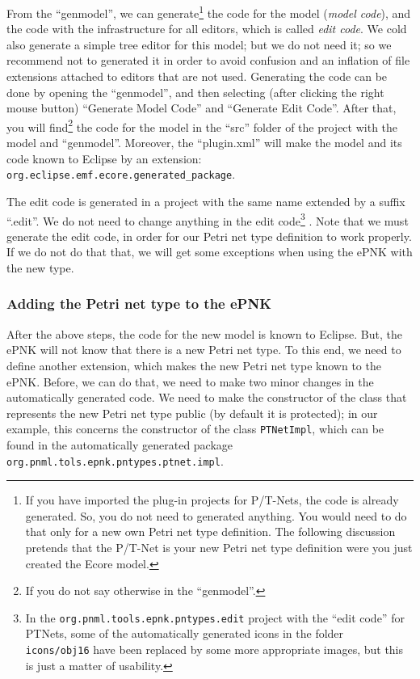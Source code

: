 From the ``genmodel'', we can generate\footnote
  {If you have imported the plug-in projects for P/T-Nets, the code is
   already generated. So, you do not need to generated anything. You would
   need to do that only for a new own Petri net type definition. The following
   discussion pretends that the P/T-Net is your new Petri net type definition
   were you just created the Ecore model.}
the code for the model (\emph{model code}),%
and the code with the infrastructure for all editors, which is called \emph{edit
code}. We cold also generate a simple tree editor for this model; but we do
not need it; so we recommend not to generated it in order to avoid confusion
and an inflation of file extensions attached to editors that are not used.
Generating the code can be done by opening
the ``genmodel'', and then selecting (after clicking the right mouse button)
``Generate Model Code'' and ``Generate Edit Code''. After that, you will find\footnote
  {If you do not say otherwise in the ``genmodel''.}
the code for the model in the ``src'' folder of the project with the model
and ``genmodel''. Moreover, the ``plugin.xml'' will make the model and
its code known to Eclipse by an extension: 
\verb$org.eclipse.emf.ecore.generated_package$.

The edit code is generated in a project with the same name extended by a
suffix ``.edit''. We do not need to change anything in the edit code\footnote
  {In the {\tt org.pnml.tools.epnk.pntypes.edit} project with the ``edit code''
   for PTNets, some of the automatically generated icons in the folder {\tt
   icons/obj16} have been replaced by some more appropriate images, but this
   is just a matter of usability.}%
. Note that we must generate the edit code, in order for our Petri net
type definition to work properly. If we do not do that that, we will get
some exceptions when using the ePNK with the new type.


\subsubsection{Adding the Petri net type to the ePNK}
\label{subsubsec:simplePNTDplugin}

After the above steps, the code for the new model is known to Eclipse. But, the
ePNK will not know that there is a new Petri net type. To this end, we need to define
another extension, which makes the new Petri net type known to the ePNK.
Before, we can do that, we need to make two minor changes in the automatically
generated code. We need to make the constructor of the class that represents the
new Petri net type public (by default it is protected); in our example, this
concerns the constructor of the class {\tt PTNetImpl}, which can be found in
the automatically generated package {\tt org.pnml.tols.epnk.pntypes.ptnet.impl}. 

